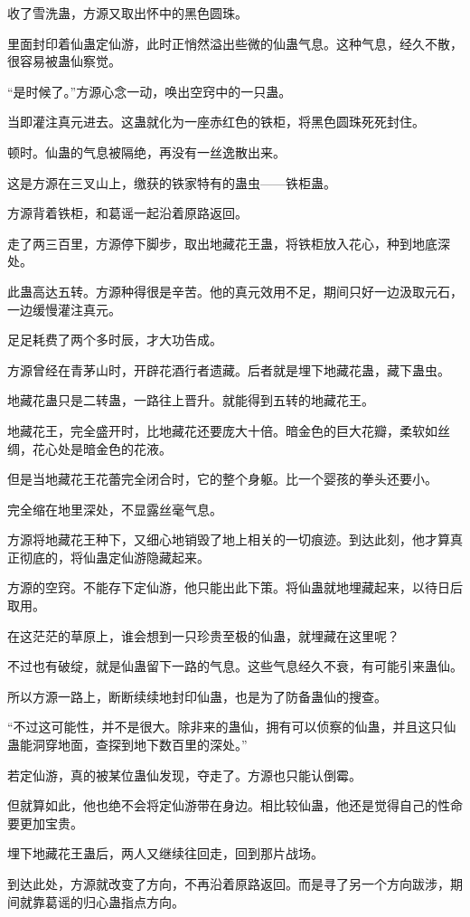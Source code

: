 \begin{this_body}
收了雪洗蛊，方源又取出怀中的黑色圆珠。

里面封印着仙蛊定仙游，此时正悄然溢出些微的仙蛊气息。这种气息，经久不散，很容易被蛊仙察觉。

“是时候了。”方源心念一动，唤出空窍中的一只蛊。

当即灌注真元进去。这蛊就化为一座赤红色的铁柜，将黑色圆珠死死封住。

顿时。仙蛊的气息被隔绝，再没有一丝逸散出来。

这是方源在三叉山上，缴获的铁家特有的蛊虫——铁柜蛊。

方源背着铁柜，和葛谣一起沿着原路返回。

走了两三百里，方源停下脚步，取出地藏花王蛊，将铁柜放入花心，种到地底深处。

此蛊高达五转。方源种得很是辛苦。他的真元效用不足，期间只好一边汲取元石，一边缓慢灌注真元。

足足耗费了两个多时辰，才大功告成。

方源曾经在青茅山时，开辟花酒行者遗藏。后者就是埋下地藏花蛊，藏下蛊虫。

地藏花蛊只是二转蛊，一路往上晋升。就能得到五转的地藏花王。

地藏花王，完全盛开时，比地藏花还要庞大十倍。暗金色的巨大花瓣，柔软如丝绸，花心处是暗金色的花液。

但是当地藏花王花蕾完全闭合时，它的整个身躯。比一个婴孩的拳头还要小。

完全缩在地里深处，不显露丝毫气息。

方源将地藏花王种下，又细心地销毁了地上相关的一切痕迹。到达此刻，他才算真正彻底的，将仙蛊定仙游隐藏起来。

方源的空窍。不能存下定仙游，他只能出此下策。将仙蛊就地埋藏起来，以待日后取用。

在这茫茫的草原上，谁会想到一只珍贵至极的仙蛊，就埋藏在这里呢？

不过也有破绽，就是仙蛊留下一路的气息。这些气息经久不衰，有可能引来蛊仙。

所以方源一路上，断断续续地封印仙蛊，也是为了防备蛊仙的搜查。

“不过这可能性，并不是很大。除非来的蛊仙，拥有可以侦察的仙蛊，并且这只仙蛊能洞穿地面，查探到地下数百里的深处。”

若定仙游，真的被某位蛊仙发现，夺走了。方源也只能认倒霉。

但就算如此，他也绝不会将定仙游带在身边。相比较仙蛊，他还是觉得自己的性命要更加宝贵。

埋下地藏花王蛊后，两人又继续往回走，回到那片战场。

到达此处，方源就改变了方向，不再沿着原路返回。而是寻了另一个方向跋涉，期间就靠葛谣的归心蛊指点方向。


\end{this_body}
